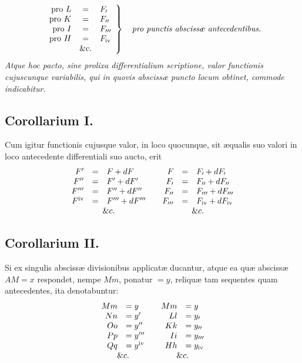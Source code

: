 \[
\left.\begin{array}{rcl}
\text{pro }L&=&F_{\prime}\\
\text{pro }K&=&F_{\prime\prime}\\
\text{pro }I&=&F_{\prime\prime\prime}\\
\text{pro }H&=&F_{\mathrm{iv}}\\
&\text{\&c.}
\end{array}\right\}
\quad\text{\textit{pro punctis abscissæ antecedentibus.}}
\]
\textit{Atque hoc pacto, sine prolixa differentialium scriptione, valor functionis cujuscunque variabilis, qui in quovis abscissæ puncto locum obtinet, commode indicabitur.}

\subsection*{Corollarium I.}
Cum igitur functionis cujusque valor, in loco quocunque, sit æqualis suo valori in loco antecedente differentiali suo aucto, erit
\[
\begin{array}{rclcrcl}
F'&=&F+dF&&F&=&F_{\prime}+dF_{\prime}\\
F''&=&F'+dF'&&F_{\prime}&=&F_{\prime\prime}+dF_{\prime\prime}\\
F'''&=&F''+dF''&&F_{\prime\prime}&=&F_{\prime\prime\prime}+dF_{\prime\prime\prime}\\
F^{\mathrm{iv}}&=&F'''+dF'''&&F_{\prime\prime\prime}&=&F_{\mathrm{iv}}+dF_{\mathrm{iv}}\\
\multicolumn{3}{c}{\&c.}&&\multicolumn{3}{c}{\&c.}
\end{array}
\]

\subsection*{Corollarium II.}
Si ex singulis abscissæ divisionibus applicatæ ducantur, atque ea quæ abscissæ $AM=x$ respondet, nempe $Mm$, ponatur $=y$, reliquæ tam sequentes quam antecedentes, ita denotabuntur:
\[
\begin{array}{rlcrl}
Mm&=y&&Mm&=y\\
Nn&=y'&&Ll&=y_{\prime}\\
Oo&=y''&&Kk&=y_{\prime\prime}\\
Pp&=y'''&&Ii&=y_{\prime\prime\prime}\\
Qq&=y^{\mathrm{iv}}&&Hh&=y_{\mathrm{iv}}\\
\multicolumn{2}{c}{\&c.}&&\multicolumn{2}{c}{\&c.}
\end{array}
\]

